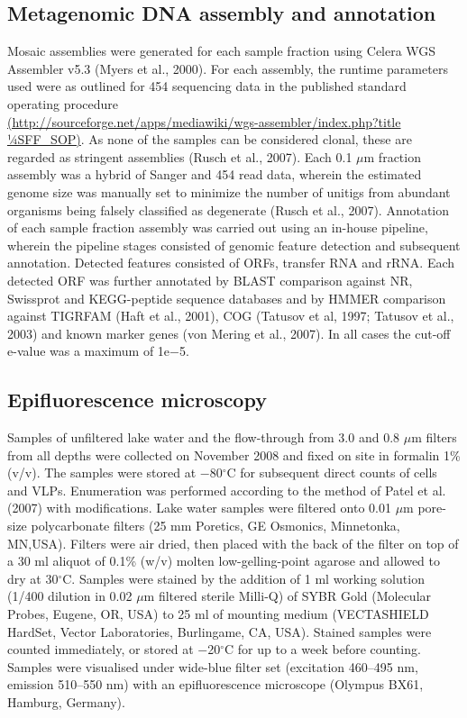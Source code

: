 \subsection{Metagenomic DNA assembly and annotation}
Mosaic assemblies were generated for each sample fraction using Celera \ac{WGS} Assembler v5.3 (Myers et al., 2000). 
For each assembly, the runtime parameters used were as outlined for 454 sequencing data in the published standard operating procedure\\ 
\url{(http://sourceforge.net/apps/mediawiki/wgs-assembler/index.php?title 1⁄4SFF\_SOP)}. 
As none of the samples can be considered clonal, these are regarded as stringent assemblies (Rusch et al., 2007). 
Each 0.1 $\mu$m fraction assembly was a hybrid of Sanger and 454 read data, wherein the estimated genome size was manually set to minimize the number of unitigs from abundant organisms being falsely classified as degenerate (Rusch et al., 2007). 
Annotation of each sample fraction assembly was carried out using an in-house pipeline, wherein the pipeline stages consisted of genomic feature detection and subsequent annotation. 
Detected features consisted of \acp{ORF}, transfer \acs{RNA} and \ac{rRNA}. Each detected \ac{ORF} was further annotated by \ac{BLAST} comparison against \ac{NR}, Swissprot and \ac{KEGG}-peptide sequence databases and by \ac{HMMER} comparison against \ac{TIGRFAM} (Haft et al., 2001), \ac{COG} (Tatusov et al, 1997; Tatusov et al., 2003) and known marker genes (von Mering et al., 2007).
In all cases the cut-off e-value was a maximum of 1e$-$5. 


\subsection{Epifluorescence microscopy}
Samples of unfiltered lake water and the flow-through from 3.0 and 0.8 $\mu$m filters from all depths were collected on November 2008 and fixed on site in formalin 1\% (v/v). 
The samples were stored at $-$80$^{\circ}$C for subsequent direct counts of cells and \acp{VLP}. 
Enumeration was performed according to the method of Patel et al. (2007) with modifications. 
Lake water samples were filtered onto 0.01 $\mu$m pore-size polycarbonate filters (25 mm Poretics, GE Osmonics, Minnetonka, MN,USA). 
Filters were air dried, then placed with the back of the filter on top of a 30 ml aliquot of 0.1\% (w/v) molten low-gelling-point agarose and allowed to dry at 30$^{\circ}$C. 
Samples were stained by the addition of 1 ml working solution (1/400 dilution in 0.02 $\mu$m filtered sterile Milli-Q) of SYBR Gold (Molecular Probes, Eugene, OR, USA) to 25 ml of mounting medium (VECTASHIELD HardSet, Vector Laboratories, Burlingame, CA, USA). 
Stained samples were counted immediately, or stored at $-$20$^{\circ}$C for up to a week before counting. 
Samples were visualised under wide-blue filter set (excitation 460--495 nm, emission 510--550 nm) with an epifluorescence microscope (Olympus BX61, Hamburg, Germany).


